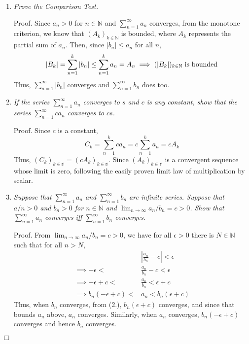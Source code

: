\documentclass[
]{article}
\begin{document}
\begin{enumerate}
\item  \textit{Prove the Comparison Test.}  

Proof. Since $a_n>0$ for $n \in \mathbb{N}$ and $\sum ^\infty _{n=1} a_n$ converges, from the monotone criterion, we know that $(A_k)_{k \in \mathbb{N}}$ is bounded, where $A_k$ represents the partial sum of $a_n$. Then, since $|b_n| \leq a_n$ for all $n$, \[|B_k| = \sum^k_{n=1}|b_n| \leq \sum^k_{n=1}a_n = A_n \\ \implies (|B_k|)_{k\in\mathbb{N}} \space \text{ is bounded}\]
Thus, $\sum^\infty_{n=1}|b_n|$ converges and $\sum^\infty_{n=1}b_n$ does too. 
  
\item \textit{If the series $\sum^\infty_{n=1}a_n$ converges to $s$ and $c$ is any constant, show that the series $\sum^\infty_{n=1}ca_n$ converges to $cs$.}  
  
Proof. Since $c$ is a constant, 
\[C_k = \sum^k_{n=1}ca_n = c\sum^k_{n=1}a_n = c A_k\]
Thus, $(C_k)_{k\in\mathbb{n}} = (cA_k)_{k\in\mathbb{n}}$. Since $(A_k)_{k\in\mathbb{n}}$ is a convergent sequence whose limit is zero, following the easily proven limit law of multiplication by scalar.  
  
\item \textit{Suppose that $\sum ^ \infty _{n=1} a_n$ and $\sum ^ \infty _{n=1} b_n$ are infinite series. Suppose that $a/n>0$ and $b_n > 0$ for $n\in\mathbb{N}$ and $\lim _{n\to\infty}a_n / b_n = c > 0$. Show that $\sum ^ \infty _{n=1} a_n$ converges iff  $\sum ^ \infty _{n=1} b_n$ converges.}  
  
Proof. From $\lim _{n\to\infty}a_n / b_n = c > 0$, we have for all $\epsilon > 0$ there is $N \in \mathbb{N}$ such that for  all $n > N$, 
\[\begin{aligned}
&|\frac{a_n}{b_n} - c| < \epsilon \\
\implies-\epsilon < &\frac{a_n}{b_n} - c < \epsilon\\
\implies  -\epsilon + c< &\frac{a_n}{b_n} < \epsilon + c \\
\implies b_n(-\epsilon + c) < &a_n < b_n(\epsilon + c)
\end{aligned}\]
Thus, when $b_n$ converges, from (2.), $b_n(\epsilon + c)$ converges, and since that bounds $a_n$ above, $a_n$ converges. Similarly, when $a_n$ converges, $b_n(-\epsilon + c)$ converges and hence $b_n$ converges. 
\end{enumerate}

\hfill \(\Box\)
\end{document}
